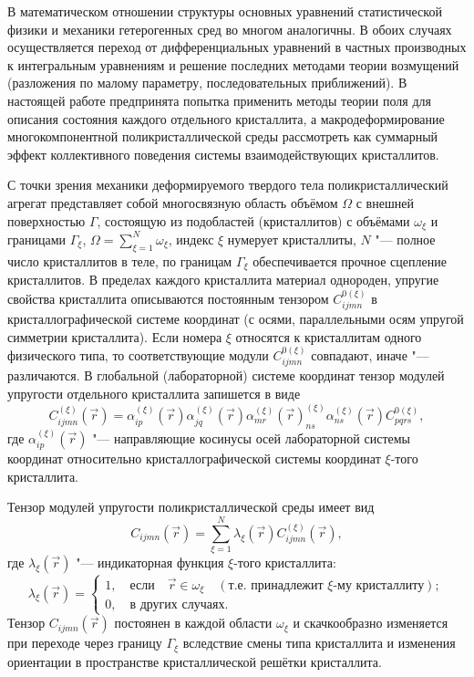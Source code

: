 В математическом отношении структуры основных уравнений статистической
физики и механики гетерогенных сред во многом аналогичны. В обоих случаях
осуществляется переход от дифференциальных уравнений в частных производных к
интегральным уравнениям и решение последних методами теории возмущений
(разложения по малому параметру, последовательных приближений). В настоящей
работе предпринята попытка применить методы теории поля для описания
состояния каждого отдельного кристаллита, а макродеформирование
многокомпонентной поликристаллической среды рассмотреть как суммарный эффект
коллективного поведения системы взаимодействующих кристаллитов.

\smallskip

 С точки зрения механики деформируемого твердого тела поликристаллический
агрегат представляет собой многосвязную область объёмом $\Omega $ с внешней
поверхностью $\Gamma$, состоящую из подобластей (кристаллитов) с объёмами
$\omega_\xi$ и границами $\Gamma _\xi$, $\Omega =\sum_{\xi
=1}^N \omega_\xi$, индекс $\xi$ нумерует кристаллиты, $N$ "--- полное число
кристаллитов в теле, по границам $\Gamma_\xi$ обеспечивается прочное
сцепление кристаллитов. В пределах каждого кристаллита материал однороден,
упругие свойства кристаллита описываются постоянным тензором
$C_{ijmn}^{0(\xi )}$ в кристаллографической системе координат (с осями,
параллельными осям упругой симметрии кристаллита). Если номера $\xi$
относятся к кристаллитам одного физического типа, то соответствующие модули $C_{ijmn}^{0(\xi)}$ совпадают,
иначе "--- различаются. В глобальной (лабораторной) системе координат тензор
модулей упругости отдельного кристаллита запишется в виде
\begin{equation}
\label{tashk:eq2}
C_{ijmn}^{(\xi )} (\vec {r})=\alpha _{ip}^{(\xi )} (\vec {r})\alpha
_{jq}^{(\xi )} (\vec {r})\alpha _{mr}^{(\xi )} (\vec {r})_{ns}^{(\xi )}
\alpha _{ns}^{(\xi )} (\vec {r})C_{pqrs}^{0(\xi )},
\end{equation}
где $\alpha _{ip}^{(\xi )} (\vec {r})$ "--- направляющие косинусы осей
лабораторной системы координат относительно кристаллографической системы
координат $\xi$-того кристаллита.

Тензор модулей упругости поликристаллической среды имеет вид
\begin{equation}
\label{tashk:eq3}
C_{ijmn}(\vec {r})=\sum\limits_{\xi =1}^N \lambda_\xi(\vec
{r})C_{ijmn}^{(\xi)} (\vec {r}),
\end{equation}
где $\lambda _\xi (\vec {r})$ "--- индикаторная функция $\xi$-того кристаллита:
$$
\lambda_\xi (\vec {r})=\begin{cases}
 1, \quad \text{если} \quad \vec {r}\in \omega_\xi \quad (\text{т.е. принадлежит}\,\,\xi\text{-му кристаллиту}); \\
0, \quad \text{в других случаях}.
\end{cases}
$$
Тензор $C_{ijmn}(\vec {r})$ постоянен в каждой области $\omega_\xi$ и
скачкообразно изменяется при переходе через границу $\Gamma_\xi$
вследствие смены типа кристаллита и изменения ориентации в пространстве
кристаллической решётки кристаллита.


